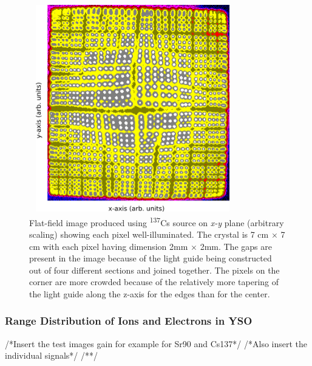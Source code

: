 \begin{figure}[h!]
	\centering
	\includegraphics[width=9cm,height=9cm]{figures/yso_inkscape1.png}
	\caption[Flat-field image produced using \textsuperscript{137}Cs source on]{Flat-field image produced using \textsuperscript{137}Cs source on \textit{x-y} plane (arbitrary scaling) showing each pixel well-illuminated. The crystal is 7 cm $\times$ 7 cm with each pixel having dimension 2mm $\times$ 2mm. The gaps are present in the image because of the light guide being constructed out of four different sections and joined together. The pixels on the corner are more crowded because of the relatively more tapering of the light guide along the z-axis for the edges than for the center.}
	\label{fig:flood_field_image}
\end{figure}
\subsubsection{Range Distribution of Ions and Electrons in YSO}


/*Insert the test images gain for example for Sr90 and Cs137*/
/*Also insert the individual signals*/
/**/

